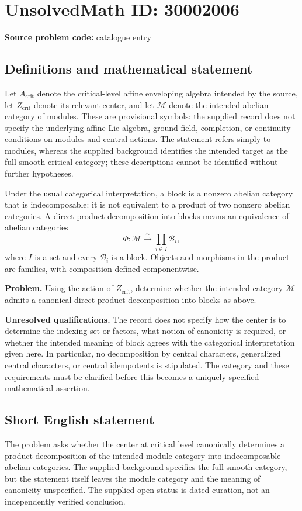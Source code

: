 \documentclass[11pt]{article}
\begin{document}
\section*{UnsolvedMath ID: 30002006}
\textbf{Source problem code:} catalogue entry
\subsection{Definitions and mathematical statement}
Let \(A_{\mathrm{crit}}\) denote the critical-level affine enveloping algebra intended by the source, let \(Z_{\mathrm{crit}}\) denote its relevant center, and let \(\mathcal M\) denote the intended abelian category of modules. These are provisional symbols: the supplied record does not specify the underlying affine Lie algebra, ground field, completion, or continuity conditions on modules and central actions. The statement refers simply to modules, whereas the supplied background identifies the intended target as the full smooth critical category; these descriptions cannot be identified without further hypotheses.

Under the usual categorical interpretation, a block is a nonzero abelian category that is indecomposable: it is not equivalent to a product of two nonzero abelian categories. A direct-product decomposition into blocks means an equivalence of abelian categories
\[
\Phi:\mathcal M\xrightarrow{\sim}\prod_{i\in I}\mathcal B_i,
\]
where \(I\) is a set and every \(\mathcal B_i\) is a block. Objects and morphisms in the product are families, with composition defined componentwise.

\textbf{Problem.} Using the action of \(Z_{\mathrm{crit}}\), determine whether the intended category \(\mathcal M\) admits a canonical direct-product decomposition into blocks as above.

\textbf{Unresolved qualifications.} The record does not specify how the center is to determine the indexing set or factors, what notion of canonicity is required, or whether the intended meaning of block agrees with the categorical interpretation given here. In particular, no decomposition by central characters, generalized central characters, or central idempotents is stipulated. The category and these requirements must be clarified before this becomes a uniquely specified mathematical assertion.
\subsection{Short English statement}
The problem asks whether the center at critical level canonically determines a product decomposition of the intended module category into indecomposable abelian categories. The supplied background specifies the full smooth category, but the statement itself leaves the module category and the meaning of canonicity unspecified. The supplied open status is dated curation, not an independently verified conclusion.
\end{document}
